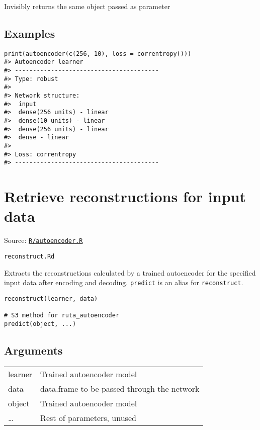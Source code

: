 Invisibly returns the same object passed as parameter

\hypertarget{examples}{\subsection{\texorpdfstring{\protect\hyperlink{examples}{}Examples}{Examples}}\label{examples}}

\begin{verbatim}
print(autoencoder(c(256, 10), loss = correntropy()))
#> Autoencoder learner
#> ----------------------------------------
#> Type: robust 
#> 
#> Network structure:
#>  input
#>  dense(256 units) - linear
#>  dense(10 units) - linear
#>  dense(256 units) - linear
#>  dense - linear
#> 
#> Loss: correntropy 
#> ----------------------------------------
\end{verbatim}

\section{Retrieve reconstructions for input
data}\label{retrieve-reconstructions-for-input-data}

Source:
\href{https://github.com/fdavidcl/ruta/blob/master/R/autoencoder.R}{\texttt{R/autoencoder.R}}

\texttt{reconstruct.Rd}

Extracts the reconstructions calculated by a trained autoencoder for the
specified input data after encoding and decoding. \texttt{predict} is an
alias for \texttt{reconstruct}.

\begin{verbatim}
reconstruct(learner, data)

# S3 method for ruta_autoencoder
predict(object, ...)
\end{verbatim}

\hypertarget{arguments}{\subsection{\texorpdfstring{\protect\hyperlink{arguments}{}Arguments}{Arguments}}\label{arguments}}

\begin{longtable}[c]{@{}>{\small}p{3cm}>{\raggedright}p{12.5cm}@{}}
\toprule
learner & Trained autoencoder model\tabularnewline
data & data.frame to be passed through the network\tabularnewline
object & Trained autoencoder model\tabularnewline
\ldots{} & Rest of parameters, unused\tabularnewline
\bottomrule
\end{longtable}

